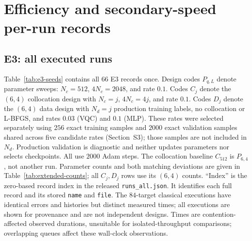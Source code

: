 \documentclass[11pt]{article}
\begin{document}
\section{Efficiency and secondary-speed per-run records}

\subsection{E3: all executed runs}

Table~\ref{tab:e3-seeds} contains all $66$ E3 records once. Design codes
$P_{q,L}$ denote parameter sweeps: $N_c=512$, $4N_c=2048$, and rate $0.1$.
Codes $C_j$ denote the $(6,4)$ collocation design with $N_c=j$,
$4N_c=4j$, and rate $0.1$. Codes $D_j$ denote the $(6,4)$ data design
with $N_d=j$ production training labels, no collocation or L-BFGS, and
rates $0.03$ (VQC) and $0.1$ (MLP). These rates were selected separately
using $256$ exact training samples and $2000$ exact validation samples
shared across five candidate rates (Section~S3); those samples are not
included in $N_d$. Production validation is diagnostic and neither
updates parameters nor selects checkpoints. All use $2000$ Adam steps.
The collocation baseline $C_{512}$ is
$P_{6,4}$, not another run. Parameter counts and both matching deviations
are given in Table~\ref{tab:extended-counts}; all $C_j,D_j$ rows use its
$(6,4)$ counts. ``Index'' is the zero-based record index in the released
\texttt{runs\_all.json}. It identifies each full record and its stored
\texttt{name} and \texttt{file}. The $84$-target classical executions
have identical errors and histories but distinct measured times;
all executions are shown for provenance and are not independent designs.
Times are contention-affected observed durations, unsuitable for
isolated-throughput comparisons; overlapping queues affect these
wall-clock observations.
\end{document}
